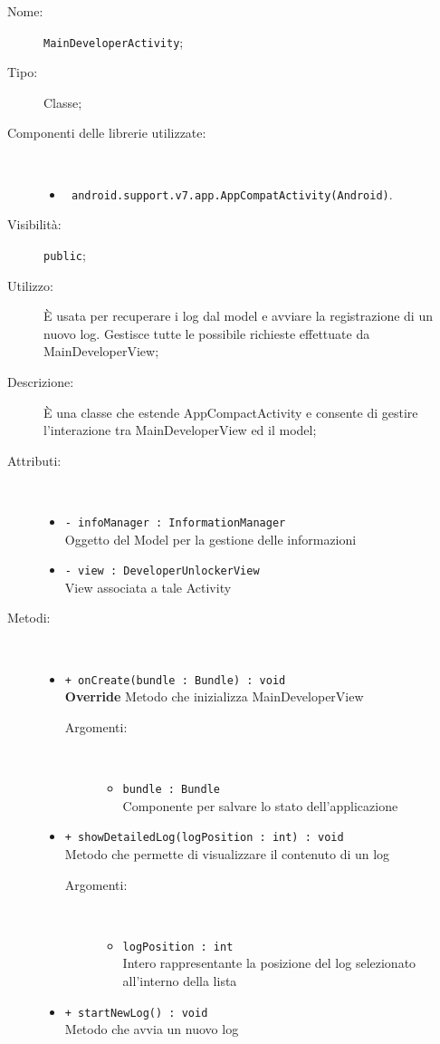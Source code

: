 \documentclass[../DefinizioneDiProdotto.tex]{subfiles}
\begin{document}
    \begin{description}
\item[Nome:] \texttt{MainDeveloperActivity};
\item[Tipo:] Classe;
\item[Componenti delle librerie utilizzate:] \
\begin{itemize}
\item \texttt{ android.support.v7.app.AppCompatActivity(Android)}.

\end{itemize}
\item[Visibilità:] \texttt{public};
\item[Utilizzo:] È usata per recuperare i log dal model e avviare la registrazione di un nuovo log. Gestisce tutte le possibile richieste effettuate da MainDeveloperView;
\item[Descrizione:] È una classe che estende AppCompactActivity e consente di gestire l'interazione tra MainDeveloperView ed il model;
\item[Attributi:] \
\begin{itemize}
\item \texttt{- infoManager : InformationManager}\\
Oggetto del Model per la gestione delle informazioni

\item \texttt{- view : DeveloperUnlockerView}\\
View associata a tale Activity

\end{itemize}
\item[Metodi:] \
\begin{itemize}
\item \texttt{+ onCreate(bundle : Bundle) : void}\\
\textbf{Override} Metodo che inizializza MainDeveloperView
 \begin{description}
\item[Argomenti:] \
\begin{itemize}
\item \texttt{bundle : Bundle}\\
Componente per salvare lo stato dell'applicazione\end{itemize}
\end{description}
\item \texttt{+ showDetailedLog(logPosition  : int) : void}\\
Metodo che permette di visualizzare il contenuto di un log
 \begin{description}
\item[Argomenti:] \
\begin{itemize}
\item \texttt{logPosition  : int}\\
Intero rappresentante la posizione del log selezionato all'interno della lista\end{itemize}
\end{description}
\item \texttt{+ startNewLog() : void}\\
Metodo che avvia un nuovo log
 \end{itemize}
\end{description}
\end{document}

